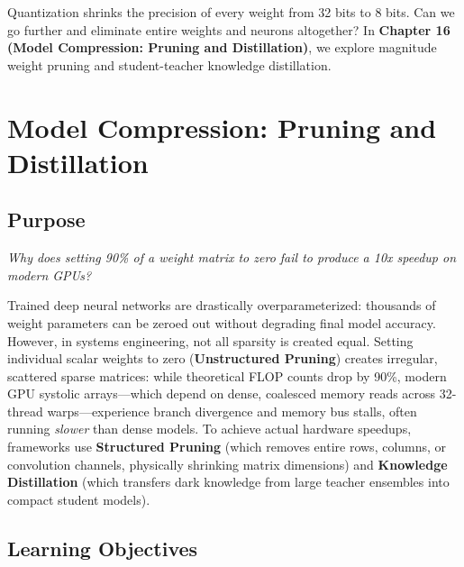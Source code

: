 \documentclass[
  letterpaper,
]{scrbook}
\begin{document}
Quantization shrinks the precision of every weight from 32 bits to 8
bits. Can we go further and eliminate entire weights and neurons
altogether? In \textbf{Chapter 16 (Model Compression: Pruning and
Distillation)}, we explore magnitude weight pruning and student-teacher
knowledge distillation.

\chapter{Model Compression: Pruning and
Distillation}\label{model-compression-pruning-and-distillation}

\section*{Purpose}\label{purpose-18}


\emph{Why does setting 90\% of a weight matrix to zero fail to produce a
10x speedup on modern GPUs?}

Trained deep neural networks are drastically overparameterized:
thousands of weight parameters can be zeroed out without degrading final
model accuracy. However, in systems engineering, not all sparsity is
created equal. Setting individual scalar weights to zero
(\textbf{Unstructured Pruning}) creates irregular, scattered sparse
matrices: while theoretical FLOP counts drop by 90\%, modern GPU
systolic arrays---which depend on dense, coalesced memory reads across
32-thread warps---experience branch divergence and memory bus stalls,
often running \emph{slower} than dense models. To achieve actual
hardware speedups, frameworks use \textbf{Structured Pruning} (which
removes entire rows, columns, or convolution channels, physically
shrinking matrix dimensions) and \textbf{Knowledge Distillation} (which
transfers dark knowledge from large teacher ensembles into compact
student models).

\section{Learning Objectives}\label{learning-objectives-16}
\end{document}
